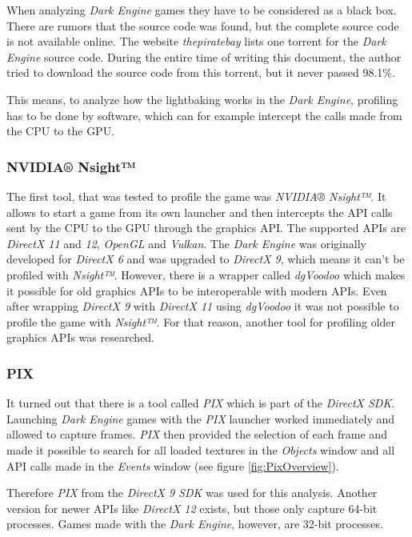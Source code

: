 When analyzing \textit{Dark Engine} games they have to be considered as a black box. There are rumors that the source code was found, but the complete source code is not available online. The website \textit{thepiratebay} lists one torrent for the \textit{Dark Engine} source code. During the entire time of writing this document, the author tried to download the source code from this torrent, but it never passed 98.1\%.

This means, to analyze how the lightbaking works in the \textit{Dark Engine}, profiling has to be done by software, which can for example intercept the calls made from the CPU to the GPU.

\subsubsection{NVIDIA® Nsight™}

The first tool, that was tested to profile the game was \textit{NVIDIA® Nsight™}. It allows to start a game from its own launcher and then intercepts the API calls sent by the CPU to the GPU through the graphics API. The supported APIs are \textit{DirectX 11} and \textit{12}, \textit{OpenGL} and \textit{Vulkan}.
The \textit{Dark Engine} was originally developed for \textit{DirectX 6} and was upgraded to \textit{DirectX 9}, which means it can’t be profiled with \textit{Nsight™}. However, there is a wrapper called \textit{dgVoodoo} which makes it possible for old graphics APIs to be interoperable with modern APIs. Even after wrapping \textit{DirectX 9} with \textit{DirectX 11} using \textit{dgVoodoo} it was not possible to profile the game with \textit{Nsight™}. For that reason, another tool for profiling older graphics APIs was researched.

\subsubsection{PIX}

It turned out that there is a tool called \textit{PIX} which is part of the \textit{DirectX SDK}. Launching \textit{Dark Engine} games with the \textit{PIX} launcher worked immediately and allowed to capture frames. \textit{PIX} then provided the selection of each frame and made it possible to search for all loaded textures in the \textit{Objects} window and all API calls made in the \textit{Events} window (see figure \ref{fig:PixOverview}). 

Therefore \textit{PIX} from the \textit{DirectX 9 SDK} was used for this analysis. Another version for newer APIs like \textit{DirectX 12} exists, but those only capture 64-bit processes. Games made with the \textit{Dark Engine}, however, are 32-bit processes.

